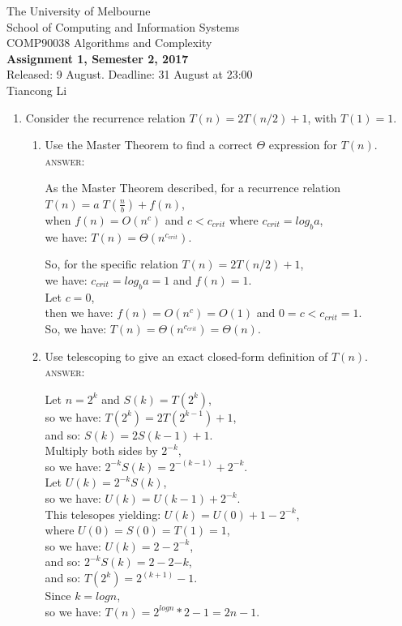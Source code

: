 \documentclass[11pt]{article}
\begin{document}
\begin{center}
{\sc The University of Melbourne
\\
School of Computing and Information Systems
\\
COMP90038 Algorithms and Complexity}
\bigskip \\
{\Large\bf Assignment 1, Semester 2, 2017}
\bigskip \\
{\large Released: 9 August.  Deadline: 31 August at 23:00}
\bigskip\\
Tiancong Li
\end{center}

\begin{enumerate}
\item
Consider the recurrence relation $T(n) = 2 T(n/2) + 1$, with $T(1) = 1$.
\begin{enumerate}
\item
Use the Master Theorem to find a correct $\Theta$ expression for $T(n)$.
\\
\textsc{answer}:
\par
As the Master Theorem described, for a recurrence relation
$T(n)=a\;T\!\left({\frac {n}{b}}\right)+f(n)$,
\\when $f(n)=O(n^{c})$ and $c<c_{crit}$ where $c_{crit}=log_ba$,
\\we have: $T(n)=\Theta(n^{c_{crit}})$.
\par
So, for the specific relation $T(n)=2T(n/2)+1$,
\\
we have: $c_{crit}=log_ba=1$ and $f(n)=1$.
\\
Let $c=0$,
\\then we have: $f(n)=O(n^c)=O(1)$ and $0=c<c_{crit}=1$.
\\
So, we have: $T(n)=\Theta(n^{c_{crit}})=\Theta(n)$.


\item
Use telescoping to give an exact closed-form definition of $T(n)$.
\\
\textsc{answer}:
\par
Let $n=2^k$ and $S(k)=T(2^k)$,
\\so we have: $T(2^k)=2T(2^{k-1})+1$,
\\and so: $S(k)=2S(k-1)+1$.
\\Multiply both sides by $2^{-k}$,
\\so we have: $2^{-k}S(k)=2^{-(k-1)}+2^{-k}$.
\\Let $U(k)=2^{-k}S(k)$,
\\so we have: $U(k)=U(k-1)+2^{-k}$.
\\This telesopes yielding: $U(k)=U(0)+1-2^{-k}$,
\\where $U(0)=S(0)=T(1)=1$,
\\so we have: $U(k)=2-2^{-k}$,
\\and so: $2^{-k}S(k)=2-2{-k}$,
\\and so: $T(2^k)=2^(k+1)-1$.
\\Since $k=logn$,
\\so we have: $T(n)=2^{logn}*2-1=2n-1$.



\end{enumerate}
\end{enumerate}
\end{document}
